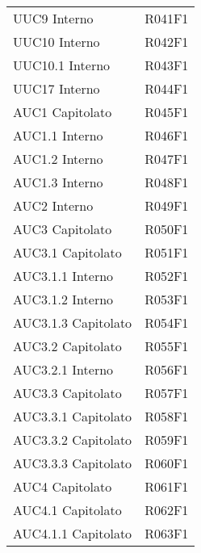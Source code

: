 \documentclass[../analisi-dei-requisiti.tex]{subfiles}
\begin{document}
\begin{longtable}[H]{ p{4cm} | p{4cm} }
  UUC9 Interno                  & R041F1                               \\
  UUC10 Interno                 & R042F1                               \\
  UUC10.1 Interno               & R043F1                               \\
  UUC17 Interno                 & R044F1                               \\
  AUC1 Capitolato               & R045F1                               \\
  AUC1.1 Interno                & R046F1                               \\
  AUC1.2 Interno                & R047F1                               \\
  AUC1.3 Interno                & R048F1                               \\
  AUC2 Interno                  & R049F1                               \\
  AUC3 Capitolato               & R050F1                               \\
  AUC3.1 Capitolato             & R051F1                               \\
  AUC3.1.1 Interno              & R052F1                               \\
  AUC3.1.2 Interno              & R053F1                               \\
  AUC3.1.3 Capitolato           & R054F1                               \\
  AUC3.2 Capitolato             & R055F1                               \\
  AUC3.2.1 Interno              & R056F1                               \\
  AUC3.3 Capitolato             & R057F1                               \\
  AUC3.3.1 Capitolato           & R058F1                               \\
  AUC3.3.2 Capitolato           & R059F1                               \\
  AUC3.3.3 Capitolato           & R060F1                               \\
  AUC4 Capitolato               & R061F1                               \\
  AUC4.1 Capitolato             & R062F1                               \\
  AUC4.1.1 Capitolato           & R063F1                               \\

\end{longtable}
\end{document}
